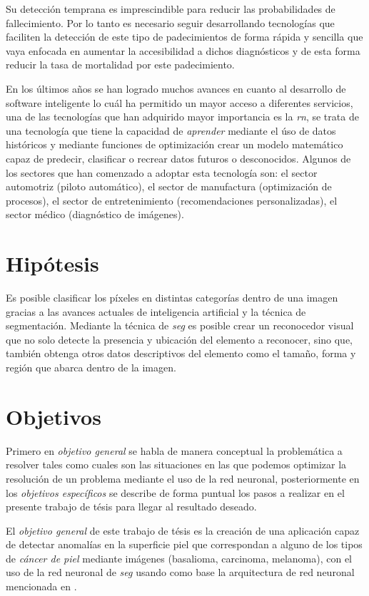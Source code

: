  Su detección temprana es imprescindible para reducir las probabilidades de fallecimiento. Por lo tanto es necesario seguir desarrollando tecnologías que faciliten la detección de este tipo de padecimientos de forma rápida y sencilla que vaya enfocada en aumentar la accesibilidad a dichos diagnósticos y de esta forma reducir la tasa de mortalidad por este padecimiento.

En los últimos años se han logrado muchos avances en cuanto al desarrollo de software inteligente lo cuál ha permitido un mayor acceso a diferentes servicios, una de las tecnologías que han adquirido mayor importancia es la \emph{\gls{rn}}, se trata de una tecnología que tiene la capacidad de \emph{aprender} mediante el úso de datos históricos y mediante funciones de optimización crear un modelo matemático capaz de predecir, clasificar o recrear datos futuros o desconocidos. Algunos de los sectores que han comenzado a adoptar esta tecnología son: el sector automotriz (piloto automático), el sector de manufactura (optimización de procesos), el sector de entretenimiento (recomendaciones personalizadas), el sector médico (diagnóstico de imágenes). 


\section{Hipótesis}
Es posible clasificar los píxeles en distintas categorías dentro de una imagen gracias a las avances actuales de inteligencia artificial y la técnica de segmentación. Mediante la técnica de \emph{\gls{seg}} es posible crear un reconocedor visual que no solo detecte la presencia y ubicación del elemento a reconocer, sino que, también obtenga otros datos descriptivos del elemento como el tamaño, forma y región que abarca dentro de la imagen.

\section{Objetivos}
Primero en \emph{objetivo general} se habla de manera conceptual la problemática a resolver tales como cuales son las situaciones en las que podemos optimizar la resolución de un problema mediante el uso de la red neuronal, posteriormente en los \emph{objetivos específicos} se describe de forma puntual los pasos a realizar en el presente trabajo de tésis para llegar al resultado deseado.

El \emph{objetivo general} de este trabajo de tésis es la creación de una aplicación capaz de detectar anomalías en la superficie piel que correspondan a alguno de los tipos de \emph{cáncer de piel} mediante imágenes (basalioma, carcinoma, melanoma), con el uso de la red neuronal de \emph{\gls{seg}} usando como base la arquitectura de red neuronal mencionada en \citet{wu2019fastfcn}. 


